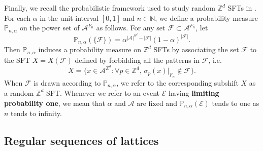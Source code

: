 \documentclass[12pt]{amsart}
\theoremstyle{definition}
\def\N{\mathbb{N}}
\def\Z{\mathbb{Z}}
\begin{document}
Finally, we recall the probabilistic framework used to study random $\mathbb{Z}^d$ SFTs in \cite{McGoffPavlov}.
For each $\alpha$ in the unit interval $[0,1]$ and $n \in \N$, we define a probability measure $\mathbb{P}_{n,\alpha}$ on the power set of $\mathcal{A}^{F_n}$ as follows. For any set $\mathcal{F} \subset \mathcal{A}^{F_n}$, let
\begin{equation*}
\mathbb{P}_{n,\alpha}( \{\mathcal{F}\}) = \alpha^{|\mathcal{A}|^{n^d} - |\mathcal{F}|} (1-\alpha)^{|\mathcal{F}|}.
\end{equation*}
Then $\mathbb{P}_{n,\alpha}$ induces a probability measure on $\Z^d$ SFTs by associating the set $\mathcal{F}$ to the SFT $X = X(\mathcal{F})$ defined by forbidding all the patterns in $\mathcal{F}$, i.e.
\begin{equation*}
X = \bigl\{ x \in \mathcal{A}^{\Z^d} : \forall p \in \Z^d, \, \sigma_p(x)|_{F_n} \notin \mathcal{F} \bigr\}.
\end{equation*}
When $\mathcal{F}$ is drawn according to $\mathbb{P}_{n,\alpha}$, we refer to the corresponding subshift $X$ as a random $\mathbb{Z}^d$ SFT.
Whenever we refer to an event $\mathcal{E}$ having \textbf{limiting probability one}, we mean that $\alpha$ and $\mathcal{A}$ are fixed and $\mathbb{P}_{n,\alpha}(\mathcal{E})$ tends to one as $n$ tends to infinity.

\subsection{Regular sequences of lattices}
\end{document}
